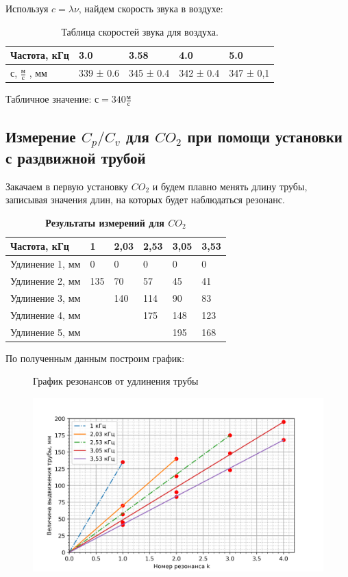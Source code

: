 \documentclass[11pt]{article}
\begin{document}
Используя $c = \lambda \nu$, найдем скорость звука в воздухе:

\begin{table}[H]
    \centering
    \caption{Таблица скоростей звука для воздуха.}
    \begin{tabular}{|l|l|l|l|l|}
    \hline
        Частота, кГц & 3.0  & 3.58  & 4.0  & 5.0 \\ \hline
        с, $\frac{м}{с}$ , мм & 339 ± 0.6  & 345 ± 0.4  & 342 ± 0.4 & 347 ± 0,1 \\ \hline
    \end{tabular}
\end{table}


    Табличное значение: $с = 340\frac{м}{с}$

\subsection{Измерение $ C_p/C_v $ для $CO_2$ при помощи установки с раздвижной трубой}

Закачаем в первую установку $CO_2$ и будем плавно менять длину трубы, записывая значения длин, на которых будет наблюдаться резонанс.


    \begin{table}[H]
    \centering
    \caption{\textbf{Результаты измерений для  $CO_2$}}
    \begin{tabular}{|l|l|l|l|l|l|}
    \hline
        Частота, кГц & 1 & 2,03 & 2,53 & 3,05 & 3,53 \\ \hline
        Удлинение 1, мм & 0 & 0 & 0 & 0 & 0 \\ \hline
        Удлинение 2, мм & 135 & 70 & 57 & 45 & 41 \\ \hline
        Удлинение 3, мм & ~ & 140 & 114 & 90 & 83 \\ \hline
        Удлинение 4, мм & ~ & ~ & 175 & 148 & 123 \\ \hline
        Удлинение 5, мм & ~ & ~ & ~ & 195 & 168 \\ \hline
    \end{tabular}
    \end{table}


    По полученным данным построим график:

    \begin{figure}[H]
    \centering
    \caption{График резонансов от удлинения трубы}
    \includegraphics[width=\textwidth]{Gr2}
    \caption{}
    \end{figure}
\end{document}
